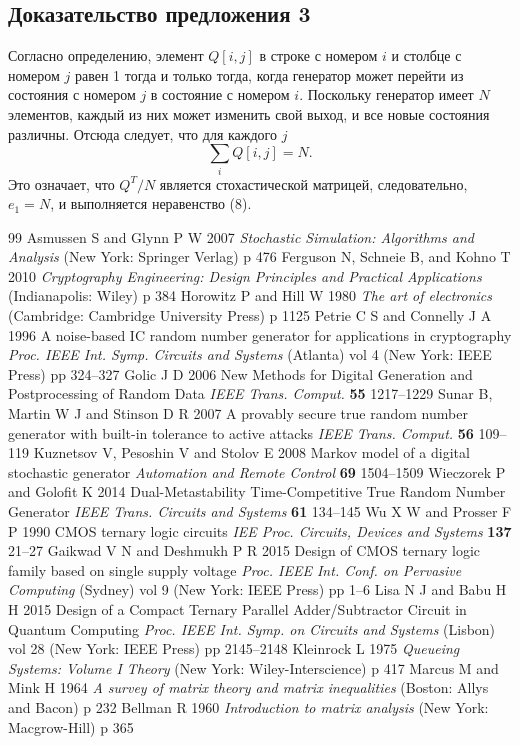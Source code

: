 \documentclass[a4paper,12pt]{article}
\begin{document}
\subsection*{Доказательство предложения 3}

Согласно определению, элемент $Q[i,j]$ в строке с номером $i$ и столбце с номером $j$ равен 1 тогда и только тогда, когда генератор может перейти из состояния с номером $j$ в состояние с номером $i$. Поскольку генератор имеет $N$ элементов, каждый из них может изменить свой выход, и все новые состояния различны. Отсюда следует, что для каждого $j$
\begin{equation}
\sum_i Q[i,j] = N. \tag{13}
\end{equation}
Это означает, что $Q^T / N$ является стохастической матрицей, следовательно, $e_1 = N$, и выполняется неравенство (8).

\begin{thebibliography}{99}
 Asmussen S and Glynn P W 2007 \textit{Stochastic Simulation: Algorithms and Analysis} (New York: Springer Verlag) p 476
 Ferguson N, Schneie B, and Kohno T 2010 \textit{Cryptography Engineering: Design Principles and Practical Applications} (Indianapolis: Wiley) p 384
 Horowitz P and Hill W 1980 \textit{The art of electronics} (Cambridge: Cambridge University Press) p 1125
 Petrie C S and Connelly J A 1996 A noise-based IC random number generator for applications in cryptography \textit{Proc. IEEE Int. Symp. Circuits and Systems} (Atlanta) vol 4 (New York: IEEE Press) pp 324--327
 Golic J D 2006 New Methods for Digital Generation and Postprocessing of Random Data \textit{IEEE Trans. Comput.} \textbf{55} 1217--1229
 Sunar B, Martin W J and Stinson D R 2007 A provably secure true random number generator with built-in tolerance to active attacks \textit{IEEE Trans. Comput.} \textbf{56} 109--119
 Kuznetsov V, Pesoshin V and Stolov E 2008 Markov model of a digital stochastic generator \textit{Automation and Remote Control} \textbf{69} 1504--1509
 Wieczorek P and Golofit K 2014 Dual-Metastability Time-Competitive True Random Number Generator \textit{IEEE Trans. Circuits and Systems} \textbf{61} 134--145
 Wu X W and Prosser F P 1990 CMOS ternary logic circuits \textit{IEE Proc. Circuits, Devices and Systems} \textbf{137} 21--27
 Gaikwad V N and Deshmukh P R 2015 Design of CMOS ternary logic family based on single supply voltage \textit{Proc. IEEE Int. Conf. on Pervasive Computing} (Sydney) vol 9 (New York: IEEE Press) pp 1--6
 Lisa N J and Babu H H 2015 Design of a Compact Ternary Parallel Adder/Subtractor Circuit in Quantum Computing \textit{Proc. IEEE Int. Symp. on Circuits and Systems} (Lisbon) vol 28 (New York: IEEE Press) pp 2145--2148
 Kleinrock L 1975 \textit{Queueing Systems: Volume I Theory} (New York: Wiley-Interscience) p 417
 Marcus M and Mink H 1964 \textit{A survey of matrix theory and matrix inequalities} (Boston: Allys and Bacon) p 232
 Bellman R 1960 \textit{Introduction to matrix analysis} (New York: Macgrow-Hill) p 365
\end{thebibliography}
\end{document}
